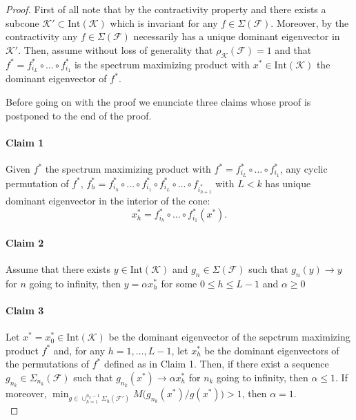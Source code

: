 \documentclass{article}
\newcommand{\family}{\mathcal{F}}
\newcommand{\cradius}{\rho_{\cone}}
\newcommand{\cone}{\mathcal{K}}
\newcommand{\interior}{\mathrm{Int}}
\begin{document}
\begin{proof}
%
First of all note that by the contractivity property and   there exists a subcone $\cone'\subset \interior(\cone)$ which is invariant for any $f\in \Sigma(\family)$. Moreover, by the contractivity any $f\in \Sigma(\family)$ necessarily has a unique dominant eigenvector in $\cone'$.
%
    Then, assume without loss of generality that $\cradius(\family)=1$ and that  $f^*=f^*_{i_L}\circ\dots \circ f_{i_1}^*$ is the spectrum maximizing product with $x^*\in \interior(\cone)$ the dominant eigenvector of $f^*$. 

    Before going on with the proof we enunciate three claims whose proof is postponed to the end of the proof.

\paragraph{Claim 1} %
Given $f^*$ the spectrum maximizing product with $f^*=f^*_{i_L}\circ\dots \circ f_{i_1}^*$, any cyclic permutation of $f^*$,  $f_h^*=f_{i_h}^*\circ\dots\circ f_{i_1}^*\circ f_{i_L}^*\circ\dots \circ f_{i_{h+1}^*}$ with $L<k$ has unique dominant eigenvector in the interior of the cone:  
    \begin{equation}
x_{h}^*=f_{i_h}^*\circ \dots \circ f_{i_1}^*(x^*). 
\end{equation}
\paragraph{Claim 2} Assume that there exists $y\in \interior(\cone)$ and $g_n\in \Sigma(\family)$ such that $g_n(y)\rightarrow y$ for $n$ going to infinity, then $y=\alpha x_{h}^*$ for some $0\leq h\leq L-1$ and $\alpha\geq 0$ 
\paragraph{Claim 3} Let $x^*=x^*_0\in \interior(\cone)$ be the dominant eigenvector of the sepctrum maximizing product $f^*$ and, for any $h=1,\dots,L-1$, let $x_h^*$ be the dominant eigenvectors of the permutations of $f^*$ defined as in Claim 1. Then, if there exist a sequence $g_{n_k}\in \Sigma_{n_k}(\family)$ such that $g_{n_k}(x^*)\rightarrow \alpha x_h^*$ for $n_k$ going to infinity, then $\alpha\leq 1$. If moreover, $\min_{g\in \cup_{h=1}^{n_k-1}\Sigma_h(\family')}M\big(g_{n_k}(x^*)/g(x^*)\big)> 1$, then $\alpha=1$. \\ 


\end{proof}
\end{document}
